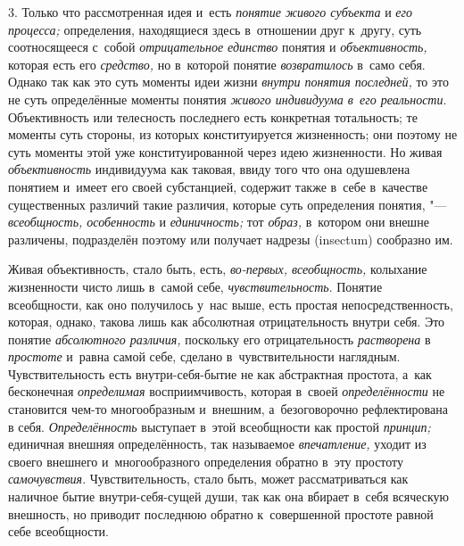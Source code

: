 3. Только что рассмотренная идея и~есть {\em понятие живого субъекта}
и {\em его процесса;} определения, находящиеся здесь в~отношении друг к~другу,
суть соотносящееся с~собой {\em отрицательное единство} понятия и
{\em объективность,} которая есть его {\em средство,} но в~которой понятие
{\em возвратилось} в~само себя. Однако так как это суть моменты идеи жизни
{\em внутри понятия последней,} то это не суть определённые моменты понятия
{\em живого индивидуума в~его реальности}.
Объективность или телесность последнего есть
конкретная тотальность; те моменты суть стороны, из которых конституируется
жизненность; они поэтому не суть моменты этой уже конституированной через
идею жизненности. Но живая {\em объективность}
индивидуума как таковая, ввиду того что она одушевлена
понятием и~имеет его своей субстанцией, содержит также в~себе в~качестве
существенных различий такие различия, которые суть определения понятия, "---
{\em всеобщность, особенность} и {\em единичность;} тот {\em образ,}
в~котором они внешне различены, подразделён поэтому или
получает надрезы (insectum) сообразно
им.

Живая объективность, стало быть, есть, {\em во-первых, всеобщность,}
колыхание жизненности чисто лишь в~самой себе, {\em чувствительность}.
Понятие всеобщности, как оно получилось у~нас выше, есть
простая непосредственность, которая, однако, такова лишь как абсолютная
отрицательность внутри себя. Это понятие {\em абсолютного различия,}
поскольку его отрицательность {\em растворена} в {\em простоте} и~равна
самой себе, сделано в~чувствительности наглядным. Чувствительность есть
внутри-себя-бытие не как абстрактная простота, а~как бесконечная
{\em определимая} восприимчивость, которая в~своей {\em определённости} не
становится чем-то многообразным и~внешним, а~безоговорочно рефлектирована в
себя. {\em Определённость} выступает в~этой всеобщности как простой
{\em принцип;} единичная внешняя определённость, так называемое
{\em впечатление,} уходит из своего внешнего и~многообразного определения
обратно в~эту простоту {\em самочувствия}.
Чувствительность, стало быть, может рассматриваться как
наличное бытие внутри-себя-сущей души, так как она вбирает в~себя всяческую
внешность, но приводит последнюю обратно к~совершенной простоте равной себе
всеобщности.

